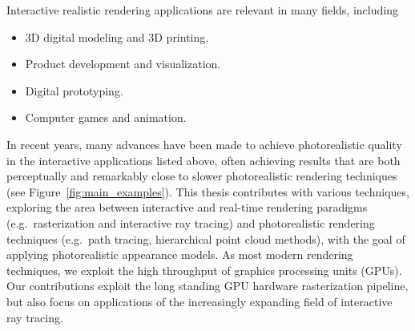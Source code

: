 Interactive realistic rendering applications are relevant in many fields, including
\begin{itemize}
\item 3D digital modeling and 3D printing.
\item Product development and visualization.
\item Digital prototyping.
\item Computer games and animation.
\end{itemize}
In recent years, many advances have been made to achieve photorealistic quality in the interactive applications listed above, often achieving results that are both perceptually and remarkably close to slower photorealistic rendering techniques (see Figure~\ref{fig:main_examples}). This thesis contributes with various techniques, exploring the area between interactive and real-time rendering paradigms (e.g.\ rasterization and interactive ray tracing) and photorealistic rendering techniques (e.g.\ path tracing, hierarchical point cloud methods), with the goal of applying photorealistic appearance models. As most modern rendering techniques, we exploit the high throughput of graphics processing units (GPUs). Our contributions exploit  the long standing GPU hardware rasterization pipeline, but also focus on applications of the increasingly expanding field of interactive ray tracing. 
%
